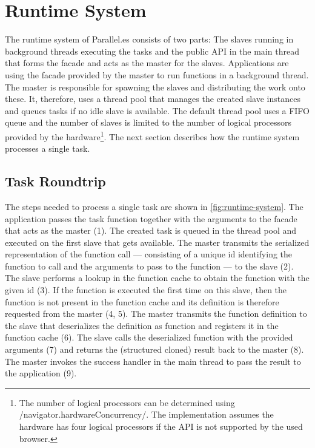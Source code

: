 \section{Runtime System}\label{sec:runtime-system}
The runtime system of Parallel.es consists of two parts: The slaves running in background threads executing the tasks and the public API in the main thread that forms the facade and acts as the master for the slaves. Applications are using the facade provided by the master to run functions in a background thread. The master is responsible for spawning the slaves and distributing the work onto these. It, therefore, uses a thread pool that manages the created slave instances and queues tasks if no idle slave is available. The default thread pool uses a FIFO queue and the number of slaves is limited to the number of logical processors provided by the hardware\footnote{The number of logical processors can be determined using \javascriptinline/navigator.hardwareConcurrency/. The implementation assumes the hardware has four logical processors if the API is not supported by the used browser.}. The next section describes how the runtime system processes a single task. 

\subsection{Task Roundtrip}
The steps needed to process a single task are shown in \cref{fig:runtime-system}. The application passes the task function together with the arguments to the facade that acts as the master (1). The created task is queued in the thread pool and executed on the first slave that gets available. The master transmits the serialized representation of the function call --- consisting of a unique id identifying the function to call and the arguments to pass to the function --- to the slave (2). The slave performs a lookup in the function cache to obtain the function with the given id (3). If the function is executed the first time on this slave, then the function is not present in the function cache and its definition is therefore requested from the master (4, 5). The master transmits the function definition to the slave that deserializes the definition as function and registers it in the function cache (6). The slave calls the deserialized function with the provided arguments (7) and returns the (structured cloned) result back to the master (8). The master invokes the success handler in the main thread to pass the result to the application (9). 


